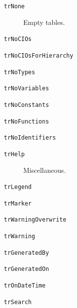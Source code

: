 \documentclass{report}
\begin{document}
\begin{list}{}
\begin{description}
\item[\texttt{trNone}] \label{PasDoc_Languages-trNone}
\index{}
Empty tables.
\item[\texttt{trNoCIOs}] \label{PasDoc_Languages-trNoCIOs}
\index{}
 
\item[\texttt{trNoCIOsForHierarchy}] \label{PasDoc_Languages-trNoCIOsForHierarchy}
\index{}
 
\item[\texttt{trNoTypes}] \label{PasDoc_Languages-trNoTypes}
\index{}
 
\item[\texttt{trNoVariables}] \label{PasDoc_Languages-trNoVariables}
\index{}
 
\item[\texttt{trNoConstants}] \label{PasDoc_Languages-trNoConstants}
\index{}
 
\item[\texttt{trNoFunctions}] \label{PasDoc_Languages-trNoFunctions}
\index{}
 
\item[\texttt{trNoIdentifiers}] \label{PasDoc_Languages-trNoIdentifiers}
\index{}
 
\item[\texttt{trHelp}] \label{PasDoc_Languages-trHelp}
\index{}
Miscellaneous.
\item[\texttt{trLegend}] \label{PasDoc_Languages-trLegend}
\index{}
 
\item[\texttt{trMarker}] \label{PasDoc_Languages-trMarker}
\index{}
 
\item[\texttt{trWarningOverwrite}] \label{PasDoc_Languages-trWarningOverwrite}
\index{}
 
\item[\texttt{trWarning}] \label{PasDoc_Languages-trWarning}
\index{}
 
\item[\texttt{trGeneratedBy}] \label{PasDoc_Languages-trGeneratedBy}
\index{}
 
\item[\texttt{trGeneratedOn}] \label{PasDoc_Languages-trGeneratedOn}
\index{}
 
\item[\texttt{trOnDateTime}] \label{PasDoc_Languages-trOnDateTime}
\index{}
 
\item[\texttt{trSearch}] \label{PasDoc_Languages-trSearch}
\index{}
 

\end{description}
\end{list}
\end{document}
